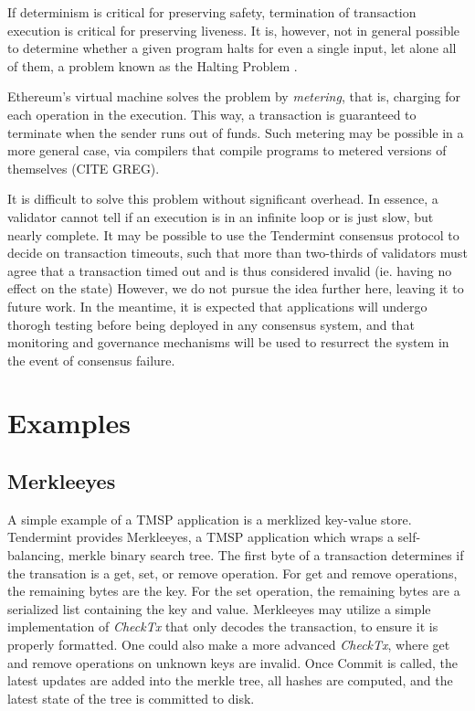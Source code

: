 If determinism is critical for preserving safety, termination of transaction execution is critical for preserving liveness.
It is, however, not in general possible to determine whether a given program halts for even a single input, let alone all of them,
a problem known as the Halting Problem \cite{halting}.

Ethereum's virtual machine solves the problem by \emph{metering}, that is, charging for each operation in the execution.
This way, a transaction is guaranteed to terminate when the sender runs out of funds.
Such metering may be possible in a more general case, 
via compilers that compile programs to metered versions of themselves \cite{} (CITE GREG).

It is difficult to solve this problem without significant overhead.
In essence, a validator cannot tell if an execution is in an infinite loop or is just slow, but nearly complete.
It may be possible to use the Tendermint consensus protocol to decide on transaction timeouts, 
such that more than two-thirds of validators must agree that a transaction timed out and is thus considered invalid (ie. having no effect on the state)
However, we do not pursue the idea further here, leaving it to future work. 
In the meantime, it is expected that applications will undergo thorogh testing before being deployed in any consensus system,
and that monitoring and governance mechanisms will be used to resurrect the system in the event of consensus failure.

\section{Examples}

\subsection{Merkleeyes}

A simple example of a TMSP application is a merklized key-value store. 
Tendermint provides Merkleeyes, a TMSP application which wraps a self-balancing, merkle binary search tree.
The first byte of a transaction determines if the transation is a get, set, or remove operation. 
For get and remove operations, the remaining bytes are the key. 
For the set operation, the remaining bytes are a serialized list containing the key and value.
Merkleeyes may utilize a simple implementation of \emph{CheckTx} that only decodes the transaction,
to ensure it is properly formatted.
One could also make a more advanced \emph{CheckTx}, where get and remove operations on unknown keys are invalid.
Once Commit is called, the latest updates are added into the merkle tree, all hashes are computed, 
and the latest state of the tree is committed to disk.


